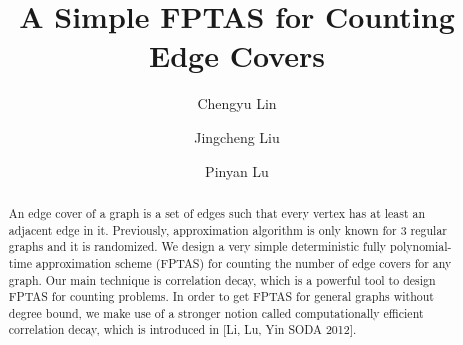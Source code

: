 \documentclass[a4paper,11pt]{article}
\title{A Simple FPTAS for Counting Edge Covers}
\begin{document}
\author{Chengyu Lin
	\and
	Jingcheng Liu
	\and
	Pinyan Lu
}
\maketitle
\begin{abstract}
An edge cover of a graph is a set of edges such that every vertex has at least an adjacent edge in it. Previously, approximation algorithm is only known for 3 regular graphs and it is randomized. We design a very simple deterministic fully polynomial-time approximation scheme  (FPTAS) for counting the number of edge covers for any graph. Our main technique is correlation decay, which is a powerful tool to design FPTAS for counting problems. In order to get FPTAS for general graphs without degree bound, we make use of a stronger notion called computationally efficient correlation decay, which is introduced in [Li, Lu, Yin SODA 2012].  
\end{abstract}
















\end{document}
